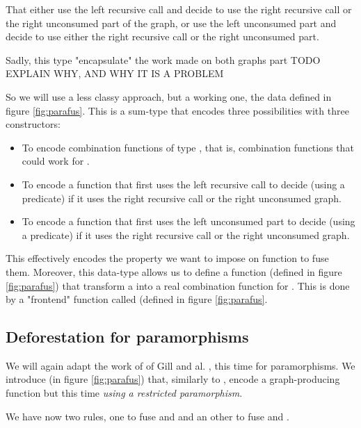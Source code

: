 That either use the left recursive call and decide to use the right recursive call or the right unconsumed part of the graph, or use the left unconsumed part and decide to use either the right recursive call or the right unconsumed part.

Sadly, this type "encapsulate" the work made on both graphs part TODO EXPLAIN WHY, AND WHY IT IS A PROBLEM

So we will use a less classy approach, but a working one, the  data defined in figure \ref{fig:parafus}. This is a sum-type that encodes three possibilities with three constructors:
\begin{itemize}
\item[\minline{B.}] To encode combination functions of type , that is, combination functions that could work for .
\item[\minline{L.}] To encode a function that first uses the left recursive call to decide (using a predicate) if it uses the right recursive call or the right unconsumed graph.
\item[\minline{R.}] To encode a function that first uses the left unconsumed part to decide (using a predicate) if it uses the right recursive call or the right unconsumed graph.
\end{itemize}

This effectively encodes the property we want to impose on function to fuse them. Moreover, this data-type allows us to define a function  (defined in figure \ref{fig:parafus}) that transform a  into a real combination function for . This is done by a "frontend" function called  (defined in figure \ref{fig:parafus}.

\subsection{Deforestation for paramorphisms}
\label{sec:defor-para}

We will again adapt the work of of Gill and al. \cite{Gill:1993:SCD:165180.165214}, this time for paramorphisms. We introduce  (in figure \ref{fig:parafus}) that, similarly to , encode a graph-producing function but this time \emph{using a restricted paramorphism}.

We have now two rules, one to fuse  and  and an other to fuse  and .




